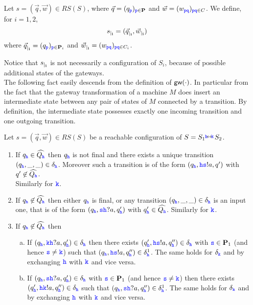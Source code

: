 \begin{definition}
Let $s= (\vec{q},\vec{w})\in RS(S)$, where $\vec{q}=(q_\ttp)_{\ttp\in\roles}$
and $\vec{w} = (w_{\ttp\ttq})_{\ttp\ttq\in C}$. We define, for $i = 1,2$,
$$\restrict{s}{i}=(\restrict{\vec{q}}{i},\restrict{\vec{w}}{i})$$
where $\restrict{\vec{q}}{i} = (q_\ttp)_{\ttp\in\roles_i}$ and 
$\restrict{\vec{w}}{i} =  (w_{\ttp\ttq})_{\ttp\ttq\in C_i}$.
\end{definition}


Notice that $\restrict{s}{i}$ is not necessarily a configuration of $S_i$, because of possible additional states of the gateways.\\


The following fact easily descends from the definition of $\gateway{\cdot}$.
In particular from the fact that the gateway transformation of a machine $M$ does insert an intermediate state
 between any pair of states of $M$ connected by a transition. By definition, the intermediate state
 possesses exactly one incoming transition and one outgoing transition. 

\begin{fact}
\label{fact:uniquesending}
Let $s= (\vec{q},\vec{w}) \in RS(S)$ be a reachable configuration of
$S ={S_{1}}\connect{\HH}{\KK} {S_{2}}$.
\begin{enumerate}
\item
\label{fact:uniquesending-i}
If ${q_\HH} \in\widehat{Q_\HH}$ then
${q_\HH}$ is not final and
 there exists a unique transition $({q_\HH},\_,\_)\in\delta_\HH$.
  Moreover such a transition is of the form
 $(q_\HH,\HH\tts!a,q')$ with $q'\not\in\widehat{Q_\HH}$.\\
Similarly for $\KK$.

\item
\label{fact:uniquesending-ii}
If ${q_\HH}\not\in\widehat{Q_\HH}$ then either $q_\HH$ is final, or any transition $({q_\HH},\_,\_)\in\delta_\HH$
is an input  one, that 
is of the form $({q_\HH},\tts\HH?a,{q'_\HH})$ with ${q'_\HH}\in\widehat{Q_\HH}$. Similarly for $\KK$.
\item
\label{fact:uniquesending-iii}
If ${q_\HH}\not\in\widehat{Q_\HH}$ then
             \begin{enumerate}[a)]
\item
If $(q_\HH,\KK\HH?a,{q'_\HH})\in\delta_\HH$  then there exists $({q'_\HH},\HH\tts!a,q''_\HH)\in\delta_\HH$ with $\tts \in \roles_1$ (and hence $\tts \neq \KK$) 
such that $(q_\HH,\HH\tts!a,q''_\HH)\in\delta^1_\HH$.
The same holds for $\delta_\KK$ and by exchanging $\HH$ with $\KK$ and vice versa.
\item
If $(q_\HH,\tts\HH?a, {q'_\HH})\in\delta_\HH$ with $\tts \in \roles_1$ (and hence $\tts \neq \KK$)  then there exists   $({q'_\HH},\HH\KK!a,q''_\HH)\in\delta_\HH$  
such that $(q_\HH,\tts\HH?a,q''_\HH)\in\delta^1_\HH$.
The same holds for $\delta_\KK$ and by exchanging $\HH$ with $\KK$ and vice versa.
              \end{enumerate}
\end{enumerate}
\end{fact}




